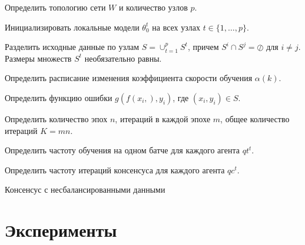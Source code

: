 \documentclass[a4paper,article,14pt]{extarticle}
\begin{document}
\begin{algorithm}[H]
\SetAlgoLined
Определить топологию сети $W$ и количество узлов $p$.

Инициализировать локальные модели $\theta_0^t$ на всех узлах $t \in \{ 1, \ldots, p \}$.

Разделить исходные данные по узлам $S = \cup_{t=1}^p S^t$, причем $S^i \cap S^j = \oslash$ для $i \ne j$. Размеры множеств $S^t$ необязательно равны.

Определить расписание изменения коэффициента скорости обучения $\alpha(k)$.

Определить функцию ошибки $g(f(x_i,),y_i)$, где $(x_i,y_i) \in S$.

Определить количество эпох $n$, итераций в каждой эпохе $m$, общее количество итераций $K=mn$.

Определить частоту обучения на одном батче для каждого агента $qt^t$.

Определить частоту итераций консенсуса для каждого агента $qc^t$.

\caption{Консенсус с несбалансированными данными}
\end{algorithm}


\section{Эксперименты}
\end{document}

